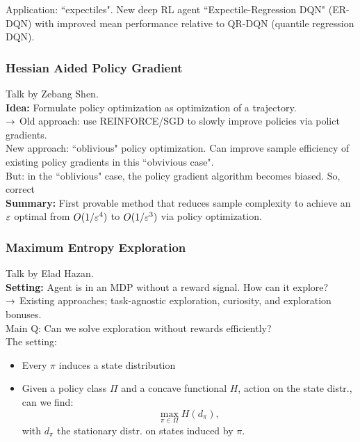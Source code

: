  Application: ``expectiles". New deep RL agent ``Expectile-Regression DQN" (ER-DQN) with improved mean performance relative to QR-DQN (quantile regression DQN).
 
 \spacerule
 
 \subsubsection{Hessian Aided Policy Gradient~\cite{shen2019hessian}}
 Talk by Zebang Shen. \\
 
 {\bf Idea:} Formulate policy optimization as optimization of a trajectory. \\
 
 $\rightarrow$ Old approach: use REINFORCE/SGD to slowly improve policies via polict gradients. \\
 
 New approach: ``oblivious" policy optimization. Can improve sample efficiency of existing policy gradients in this ``obvivious case". \\
 
 But: in the ``oblivious" case, the policy gradient algorithm becomes biased. So, correct \\
 
 {\bf Summary:} First provable method that reduces sample complexity to achieve an $\varepsilon$ optimal from $O(1/\varepsilon^4)$ to $O(1/\varepsilon^3)$ via policy optimization.
 
 \spacerule
 
 \subsubsection{Maximum Entropy Exploration~\cite{hazan2018provably}}
 
 Talk by Elad Hazan. \\
 
 {\bf Setting:} Agent is in an MDP without a reward signal. How can it explore? \\
 
 $\rightarrow$ Existing approaches; task-agnostic exploration, curiosity, and exploration bonuses. \\
 
 Main Q: Can we solve exploration without rewards efficiently? \\
 
 The setting:
 \begin{itemize}
     \item Every $\pi$ induces a state distribution
     \item Given a policy class $\Pi$ and a concave functional $H$, action on the state distr., can we find:
     \[
     \max_{\pi \in \Pi} H(d_\pi),
     \]
     with $d_\pi$ the stationary distr. on states induced by $\pi$.
 \end{itemize}
 
